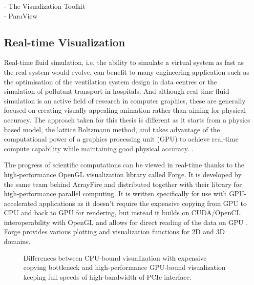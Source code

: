 - The Visualization Toolkit \\
- ParaView \\


\subsection{Real-time Visualization}
\label{rt-viz}

Real-time fluid simulation, i.e. the ability to simulate a virtual system as fast as the real system would evolve, can benefit to many engineering application such as the optimisation of the ventilation system design in data centres or the simulation of pollutant transport in hospitals. And although real-time fluid simulation is an active field of research in computer graphics, these are generally focused on creating visually appealing animation rather than aiming for physical accuracy. The approach taken for this thesis is different as it starts from a physics based model, the lattice Boltzmann method, and takes advantage of the computational power of a graphics processing unit (GPU) to achieve real-time compute capability while maintaining good physical accuracy. \cite{delboscRealTimeSimulationIndoor}.

The progress of scientific computations can be viewed in real-time thanks to the high-performance OpenGL visualization library called Forge. It is developed by the same team behind ArrayFire and distributed together with their library for high-performance parallel computing. It is written specifically for use with GPU-accelerated applications as it doesn't require the expensive copying from GPU to CPU and back to GPU for rendering, but instead it builds on CUDA/OpenCL interoperability with OpenGL and allows for direct reading of the data on GPU \cite{forge2016}. Forge provides various plotting and visualization functions for 2D and 3D domains.

\begin{figure}[!ht]
	\centering
	 \qquad
	\caption{Differences between CPU-bound visualization with expensive copying bottleneck and high-performance GPU-bound visualization keeping full speeds of high-bandwidth of PCIe interface.}
	\label{fig:viz-forge-main}
\end{figure}

